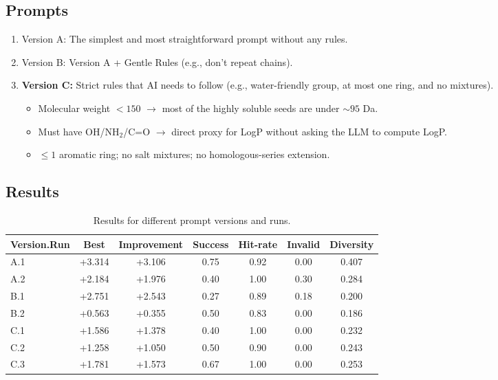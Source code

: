 \documentclass[11pt,a4paper]{article}
\begin{document}
\subsection{Prompts}
\begin{enumerate}
    \item Version A: The simplest and most straightforward prompt without any rules. 
    \item Version B: Version A + Gentle Rules (e.g., don't repeat chains).
    \item \textbf{Version C:} Strict rules that AI needs to follow (e.g., water-friendly group, at most one ring, and no mixtures). 
    
    \begin{itemize}
        \item Molecular weight $< 150$ $\rightarrow$ most of the highly soluble seeds are under $\sim 95$ Da.
        \item Must have OH/NH$_2$/C=O $\rightarrow$ direct proxy for LogP without asking the LLM to compute LogP.
        \item $\le 1$ aromatic ring; no salt mixtures; no homologous-series extension.
    \end{itemize}

\end{enumerate}

\subsection{Results}
\begin{table}[h]
\centering
\begin{tabular}{lcccccc}
\hline
Version.Run & Best & Improvement & Success & Hit-rate & Invalid & Diversity \\
\hline
A.1 & +3.314 & +3.106 & 0.75 & 0.92 & 0.00 & 0.407 \\
A.2 & +2.184 & +1.976 & 0.40 & 1.00 & 0.30 & 0.284 \\
B.1 & +2.751 & +2.543 & 0.27 & 0.89 & 0.18 & 0.200 \\
B.2 & +0.563 & +0.355 & 0.50 & 0.83 & 0.00 & 0.186 \\
C.1 & +1.586 & +1.378 & 0.40 & 1.00 & 0.00 & 0.232 \\
C.2 & +1.258 & +1.050 & 0.50 & 0.90 & 0.00 & 0.243 \\
C.3 & +1.781 & +1.573 & 0.67 & 1.00 & 0.00 & 0.253 \\
\hline
\end{tabular}
\caption{Results for different prompt versions and runs.}
\label{tab:results}
\end{table}
\end{document}
